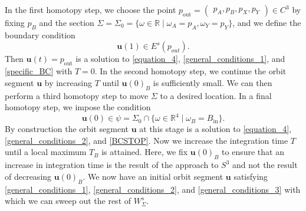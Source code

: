 \documentclass{ws-ijbc}
\begin{document}
In the first homotopy step, we choose the point $p_{\text{out}}=\begin{pmatrix} p_A, p_B, p_X, p_Y \end{pmatrix}  \in C^3$ by fixing $p_B$ and the section $\Sigma=\Sigma_0=\{\omega \in \mathbb{R} \; | \;  \omega_A=p_A, \omega_Y=p_Y\}$, and we define the boundary condition
%
\begin{equation}
	\mathbf{u}(1) \in E^s(p_{out}).
	\label{specific_BC}
\end{equation}
%
Then $\mathbf{u}(t)=p_{\text{out}}$ is a solution to \eqref{equation_4}, \eqref{general_conditions_1}, and \eqref{specific_BC} with $T=0$.  In the second homotopy step, we continue the orbit segment $\mathbf{u}$ by increasing $T$ until $\mathbf{u}(0)_B$ is sufficiently small.  We can then perform a third homotopy step to move $\Sigma$ to a desired location.  In a final homotopy step, we impose the condition
%
\begin{equation}
	\mathbf{u}(0) \in \psi=\Sigma_{0} \cap \{ \omega \in \mathbb{R}^4 \; | \; \omega_B = B_{\text{in}} \}.
	\label{BCSTOP}
\end{equation}
%
By construction the orbit segment $\mathbf{u}$ at this stage is a solution to \eqref{equation_4}, \eqref{general_conditions_2}, and \eqref{BCSTOP}.  Now we increase the integration time $T$ until a local maximum $T_B$ is attained.  Here, we fix $\mathbf{u}(0)_B$ to ensure that an increase in integration time is the result of the approach to $S^3$ and not the result of decreasing $\mathbf{u}(0)_B$.  We now have an initial orbit segment $\mathbf{u}$ satisfying \eqref{general_conditions_1}, \eqref{general_conditions_2}, and \eqref{general_conditions_3} with which we can sweep out the rest of $W^s_\Sigma$.
\end{document}
